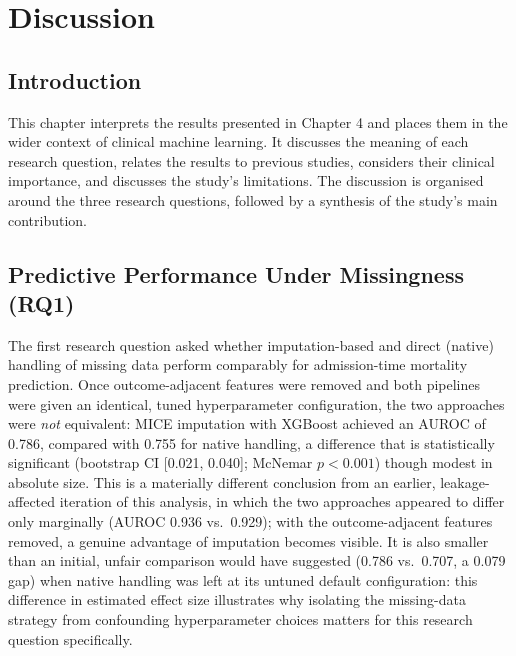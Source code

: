 \documentclass[12pt,a4paper]{report}
\begin{document}
\chapter{Discussion}

\section{Introduction}
This chapter interprets the results presented in Chapter 4 and places them in the wider context of clinical machine learning. It discusses the meaning of each research question, relates the results to previous studies, considers their clinical importance, and discusses the study's limitations. The discussion is organised around the three research questions, followed by a synthesis of the study's main contribution.


\section{Predictive Performance Under Missingness (RQ1)}
The first research question asked whether imputation-based and direct (native) handling of missing data perform comparably for admission-time mortality prediction. Once outcome-adjacent features were removed and both pipelines were given an identical, tuned hyperparameter configuration, the two approaches were \emph{not} equivalent: MICE imputation with XGBoost achieved an AUROC of 0.786, compared with 0.755 for native handling, a difference that is statistically significant (bootstrap CI [0.021, 0.040]; McNemar $p<0.001$) though modest in absolute size. This is a materially different conclusion from an earlier, leakage-affected iteration of this analysis, in which the two approaches appeared to differ only marginally (AUROC 0.936 vs.\ 0.929); with the outcome-adjacent features removed, a genuine advantage of imputation becomes visible. It is also smaller than an initial, unfair comparison would have suggested (0.786 vs.\ 0.707, a 0.079 gap) when native handling was left at its untuned default configuration: this difference in estimated effect size illustrates why isolating the missing-data strategy from confounding hyperparameter choices matters for this research question specifically.
\end{document}
